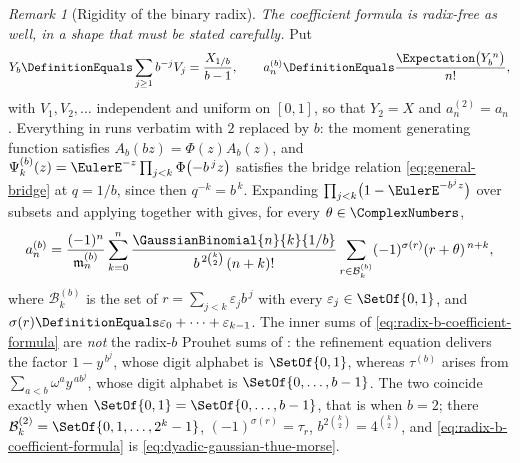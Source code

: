 \documentclass[11pt,a4paper,oneside,openany]{book}
\theoremstyle{definition}
\theoremstyle{remark}
\newtheorem{remark}[remark]{Remark}
\begin{document}
\begin{remark}[Rigidity of the binary radix]
\emph{The coefficient formula is radix-free as well, in a shape that must be stated carefully.}  Put
\[
 Y_b\DefinitionEquals\sum_{j\ge1}b^{-j}V_j=\frac{X_{1/b}}{b-1},
 \qquad
 a^{(b)}_n\DefinitionEquals\frac{\Expectation\bigl(Y_b^{\,n}\bigr)}{n!},
\]
with $V_1,V_2,\ldots$ independent and uniform on $[0,1]$, so that $Y_2=X$ and $a^{(2)}_n=a_n$.  Everything in  runs verbatim with $2$ replaced by $b$: the moment generating function satisfies $A_b(bz)=\Phi(z)A_b(z)$, and $\Psi^{(b)}_k(z)=\EulerE^{-z}\prod_{j<k}\Phi\bigl(-b^{\,j}z\bigr)$ satisfies the bridge relation \eqref{eq:general-bridge} at $q=1/b$, since then $q^{-k}=b^{\,k}$.  Expanding $\prod_{j<k}\bigl(1-\EulerE^{-b^{j}z}\bigr)$ over subsets and applying  together with  gives, for every $\theta\in\ComplexNumbers$,
\begin{equation}\label{eq:radix-b-coefficient-formula}
 a^{(b)}_n
 =\frac{(-1)^n}{\mathfrak m^{(b)}_n}
  \sum_{k=0}^{n}\frac{\GaussianBinomial{n}{k}{1/b}}{b^{\,2\binom k2}\,(n+k)!}
  \sum_{r\in\mathcal B^{(b)}_k}(-1)^{\sigma(r)}(r+\theta)^{\,n+k},
\end{equation}
where $\mathcal B^{(b)}_k$ is the set of $r=\sum_{j<k}\varepsilon_jb^{\,j}$ with every $\varepsilon_j\in\SetOf{0,1}$, and $\sigma(r)\DefinitionEquals\varepsilon_0+\cdots+\varepsilon_{k-1}$.  The inner sums of \eqref{eq:radix-b-coefficient-formula} are \emph{not} the radix-$b$ Prouhet sums of : the refinement equation delivers the factor $1-y^{\,b^{j}}$, whose digit alphabet is $\SetOf{0,1}$, whereas $\tau^{(b)}$ arises from $\sum_{a<b}\omega^ay^{\,ab^{j}}$, whose digit alphabet is $\SetOf{0,\ldots,b-1}$.  The two coincide exactly when $\SetOf{0,1}=\SetOf{0,\ldots,b-1}$, that is when $b=2$; there $\mathcal B^{(2)}_k=\SetOf{0,1,\ldots,2^k-1}$, $(-1)^{\sigma(r)}=\tau_r$, $b^{2\binom k2}=4^{\binom k2}$, and \eqref{eq:radix-b-coefficient-formula} is \eqref{eq:dyadic-gaussian-thue-morse}.


\end{remark}
\end{document}
